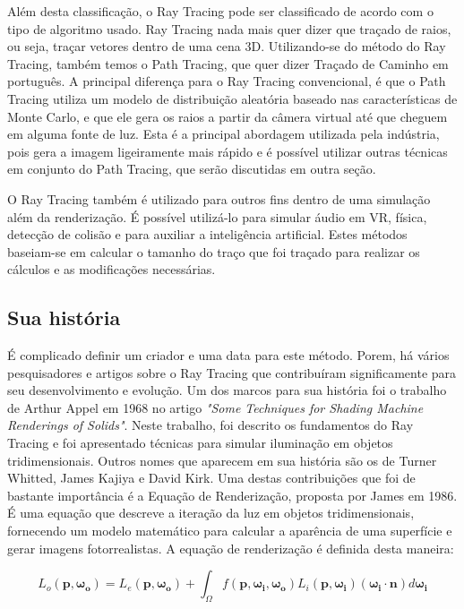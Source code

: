 \documentclass[journal]{IEEEtran}
\begin{document}
Além desta classificação, o Ray Tracing pode ser classificado de acordo com o tipo
de algoritmo usado. Ray Tracing nada mais quer dizer que traçado de raios, ou seja,
traçar vetores dentro de uma cena 3D. Utilizando-se do método do Ray Tracing, também
temos o Path Tracing, que quer dizer Traçado de Caminho em português. A principal
diferença para o Ray Tracing convencional, é que o Path Tracing utiliza um modelo
de distribuição aleatória baseado nas características de Monte Carlo, e que ele gera
os raios a partir da câmera virtual até que cheguem em alguma fonte de luz. Esta é a 
principal abordagem utilizada pela indústria, pois gera a imagem ligeiramente
mais rápido e é possível utilizar outras técnicas em conjunto do Path Tracing,
que serão discutidas em outra seção.
\cite{c4}

O Ray Tracing também é utilizado para outros fins dentro de uma simulação além
da renderização. É possível utilizá-lo para simular áudio em VR, física, detecção
de colisão e para auxiliar a inteligência artificial. Estes métodos baseiam-se em
calcular o tamanho do traço que foi traçado para realizar os cálculos e as modificações
necessárias.
\cite{c10}

\subsection{Sua história}
É complicado definir um criador e uma data para este método. Porem, há vários
pesquisadores e artigos sobre o Ray Tracing que contribuíram significamente para
seu desenvolvimento e evolução. Um dos marcos para sua história foi o trabalho
de Arthur Appel em 1968 no artigo \emph{"Some Techniques for Shading Machine
Renderings of Solids"}. Neste trabalho, foi descrito os fundamentos do Ray Tracing
e foi apresentado técnicas para simular iluminação em objetos tridimensionais.
Outros nomes que aparecem em sua história são os de Turner Whitted, James Kajiya
e David Kirk. Uma destas contribuições que foi de bastante importância é a
Equação de Renderização, proposta por James em 1986. É uma equação que descreve
a iteração da luz em objetos tridimensionais, fornecendo um modelo matemático
para calcular a aparência de uma superfície e gerar imagens fotorrealistas.
A equação de renderização é definida desta maneira:

\[
L_o(\mathbf{p}, \mathbf{\omega_o}) = L_e(\mathbf{p}, \mathbf{\omega_o}) + \int_{\Omega} f(\mathbf{p}, \mathbf{\omega_i}, \mathbf{\omega_o}) L_i(\mathbf{p}, \mathbf{\omega_i}) (\mathbf{\omega_i} \cdot \mathbf{n}) d\mathbf{\omega_i}
\]
\end{document}
